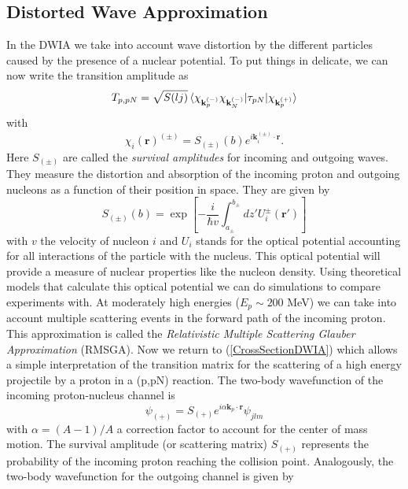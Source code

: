 \documentclass[11pt]{article}
\numberwithin{equation}{section}
\begin{document}
\subsection{Distorted Wave Approximation}
In the DWIA we take into account wave distortion by the different particles caused by the presence of a nuclear potential. To put things in delicate, we can now write the transition amplitude as
\begin{equation}\label{CrossSectionDWIA}
	T_{p,pN} = \sqrt{S(lj)} \braket{ \chi_{\mathbf{k}^{(-)}_p} \chi_{\mathbf{k}^{(-)}_N} | \tau_{pN} | \chi_{\mathbf{k}^{(+)}_p}}
\end{equation}
with
\begin{equation}
	\chi_i(\mathbf{r})^{(\pm)} = S_{(\pm)}(b) e^{i\mathbf{k}_i^{(\pm)} \cdot \mathbf{r}}.
\end{equation}
Here $S_{(\pm)}$ are called the \emph{survival amplitudes} for incoming and outgoing waves. They measure the distortion and absorption of the incoming proton and outgoing nucleons as a function of their position in space. They are given by
\begin{equation}
	S_{(\pm)}(b) = \exp \left[ -\frac{i}{\hbar v} \int^{b_{\pm}}_{a_{\pm}} dz' U_i^{\pm} (\mathbf{r}')\right]
\end{equation}
with $v$ the velocity of nucleon $i$ and $U_i$ stands for the optical potential accounting for all interactions of the particle with the nucleus. This optical potential will provide a measure of nuclear properties like the nucleon density. Using theoretical models that calculate this optical potential we can do simulations to compare experiments with. At moderately high energies ($ E_p \sim 200$ MeV) we can take into account multiple scattering events in the forward path of the incoming proton. This approximation is called the \emph{Relativistic Multiple Scattering Glauber Approximation} (RMSGA). Now we return to (\ref{CrossSectionDWIA}) which allows a simple interpretation of the transition matrix for the scattering of a high energy projectile by a proton in a (p,pN) reaction. The two-body wavefunction of the incoming proton-nucleus channel is
\begin{equation}
	\psi_{(+)} = S_{(+)}e^{i \alpha \mathbf{k}_p \cdot \mathbf{r}}\psi_{jlm} 
\end{equation}
with $\alpha = (A-1)/A$ a correction factor to account for the center of mass motion. The survival amplitude (or scattering matrix) $S_{(+)}$ represents the probability of the incoming proton reaching the collision point. Analogously, the two-body wavefunction for the outgoing channel is given by
\end{document}
